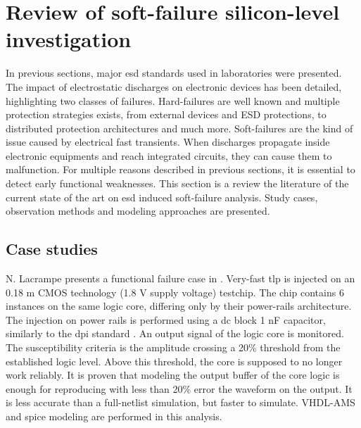 \section{Review of soft-failure silicon-level investigation}

In previous sections, major \gls{esd} standards used in laboratories were presented.
The impact of electrostatic discharges on electronic devices has been detailed, highlighting two classes of failures.
Hard-failures are well known and multiple protection strategies exists, from external devices and ESD protections, to distributed protection architectures and much more.
Soft-failures are the kind of issue caused by electrical fast transients.
When discharges propagate inside electronic equipments and reach integrated circuits, they can cause them to malfunction.
For multiple reasons described in previous sections, it is essential to detect early functional weaknesses.
This section is a review the literature of the current state of the art on \gls{esd} induced soft-failure analysis.
Study cases, observation methods and modeling approaches are presented.

\subsection{Case studies}

N. Lacrampe presents a functional failure case in \cite{LacrampeTransientImmunity}.
Very-fast \gls{tlp} is injected on an 0.18 \textmu{}m CMOS technology (1.8 V supply voltage) testchip.
The chip contains 6 instances on the same logic core, differing only by their power-rails architecture.
The injection on power rails is performed using a \gls{dc} block 1 nF capacitor, similarly to the \gls{dpi} standard \cite{iec62132-4}.
An output signal of the logic core is monitored.
The susceptibility criteria is the amplitude crossing a 20\% threshold from the established logic level.
Above this threshold, the core is supposed to no longer work reliably.
It is proven that modeling the output buffer of the core logic is enough for reproducing with less than 20\% error the waveform on the output.
It is less accurate than a full-netlist simulation, but faster to simulate.
VHDL-AMS and \gls{spice} modeling are performed in this analysis.


